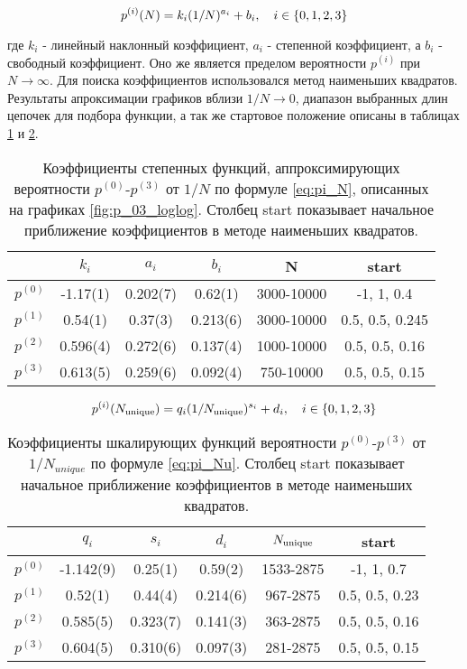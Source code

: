 \begin{equation}
p^{(i)}(N) = k_i  (1/N)^{a_i} + b_i, \ \ \ i \in \{ 0,1,2,3\} \\
\label{eq:pi_N}
\end{equation}

где $k_i$ - линейный наклонный коэффициент, $a_i$ - степенной коэффициент, а $b_i$ - свободный коэффициент. 
Оно же является пределом вероятности $p^{(i)}$ при $N \to \infty$.
Для поиска коэффициентов использовался метод наименьших квадратов.
Результаты апроксимации графиков вблизи $1/N \to 0$, диапазон выбранных длин цепочек для подбора функции,
а так же стартовое положение описаны в таблицах \ref{tab:p_i_log_log} и \ref{tab:p_i_u_log_log}. 

\begin{table}[h] 
\centering
\begin{tabular}{|c|c|c|c|c|c|}
\hline
 & $k_i$ & $a_i$ & $b_i$ & N & start  \\ \hline
$p^{(0)}$ & -1.17(1) & 0.202(7) & 0.62(1) & 3000-10000 & -1, 1, 0.4 \\ \hline 
$p^{(1)}$ & 0.54(1) & 0.37(3) & 0.213(6) & 3000-10000 & 0.5, 0.5, 0.245 \\ \hline
$p^{(2)}$ & 0.596(4) & 0.272(6) & 0.137(4) & 1000-10000 & 0.5, 0.5, 0.16 \\ \hline
$p^{(3)}$ & 0.613(5) & 0.259(6) & 0.092(4) & 750-10000 & 0.5, 0.5, 0.15 \\ \hline
\end{tabular}
\caption{Коэффициенты степенных функций, аппроксимирующих вероятности $p^{(0)}$-$p^{(3)}$ от $1/N$ по формуле \eqref{eq:pi_N}, описанных на графиках \ref{fig:p_03_loglog}. Столбец start показывает начальное приближение коэффициентов в методе наименьших квадратов.}
\label{tab:p_i_log_log}
\end{table}

\begin{equation}
p^{(i)}(N_{\textup{unique}}) = q_i  (1/N_{\textup{unique}})^{s_i} + d_i, \ \ \ i \in \{ 0,1,2,3\}
\label{eq:pi_Nu}
\end{equation}

\begin{table}[h]
\centering
\begin{tabular}{|c|c|c|c|c|c|} \hline
 & $q_i$ & $s_i$ & $d_i$ & $N_{\textup{unique}}$ & start  \\ \hline
$p^{(0)}$ & -1.142(9) & 0.25(1) & 0.59(2) & 1533-2875 &  -1, 1, 0.7 \\ \hline
$p^{(1)}$ & 0.52(1) & 0.44(4) & 0.214(6) & 967-2875 & 0.5, 0.5, 0.23\\ \hline
$p^{(2)}$ & 0.585(5) & 0.323(7) & 0.141(3) & 363-2875  & 0.5, 0.5, 0.16\\ \hline
$p^{(3)}$ & 0.604(5) & 0.310(6) & 0.097(3) & 281-2875 & 0.5, 0.5, 0.15\\ \hline
\end{tabular}

\caption{Коэффициенты шкалирующих функций вероятности $p^{(0)}$-$p^{(3)}$ от $1/N_{unique}$ по формуле \eqref{eq:pi_Nu}. Столбец start показывает начальное приближение коэффициентов в методе наименьших квадратов.}
\label{tab:p_i_u_log_log}
\end{table}


